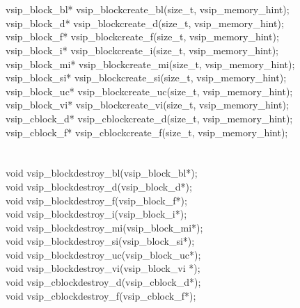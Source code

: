 \\\cvsiplh 
\begin{cfuncs}
\\\hline
vsip\_block\_bl* vsip\_blockcreate\_bl(size\_t, vsip\_memory\_hint);\Bs\\
vsip\_block\_d* vsip\_blockcreate\_d(size\_t, vsip\_memory\_hint);\Bs\\
vsip\_block\_f* vsip\_blockcreate\_f(size\_t, vsip\_memory\_hint);\Bs\\
vsip\_block\_i* vsip\_blockcreate\_i(size\_t, vsip\_memory\_hint);\Bs\\
vsip\_block\_mi* vsip\_blockcreate\_mi(size\_t, vsip\_memory\_hint);\Bs\\
vsip\_block\_si* vsip\_blockcreate\_si(size\_t, vsip\_memory\_hint);\Bs\\
vsip\_block\_uc* vsip\_blockcreate\_uc(size\_t, vsip\_memory\_hint);\Bs\\
vsip\_block\_vi* vsip\_blockcreate\_vi(size\_t, vsip\_memory\_hint);\Bs\\
vsip\_cblock\_d* vsip\_cblockcreate\_d(size\_t, vsip\_memory\_hint);\Bs\\
vsip\_cblock\_f* vsip\_cblockcreate\_f(size\_t, vsip\_memory\_hint);\Bs\\ 
\hline\hline\\
\\\hline
void vsip\_blockdestroy\_bl(vsip\_block\_bl*);\Bs\\
void vsip\_blockdestroy\_d(vsip\_block\_d*);\Bs\\
void vsip\_blockdestroy\_f(vsip\_block\_f*);\Bs\\
void vsip\_blockdestroy\_i(vsip\_block\_i*);\Bs\\
void vsip\_blockdestroy\_mi(vsip\_block\_mi*);\Bs\\
void vsip\_blockdestroy\_si(vsip\_block\_si*);\Bs\\
void vsip\_blockdestroy\_uc(vsip\_block\_uc*);\Bs\\
void vsip\_blockdestroy\_vi(vsip\_block\_vi *);\Bs\\
void vsip\_cblockdestroy\_d(vsip\_cblock\_d*);\Bs\\
void vsip\_cblockdestroy\_f(vsip\_cblock\_f*);\Bs\\
\end{cfuncs}
